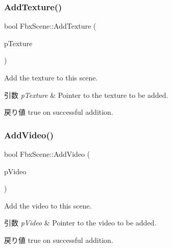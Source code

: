 \mbox{\label{class_fbx_scene_a19321c754cefd2a1576477d8e8353472}} 
\subsubsection{\texorpdfstring{Add\+Texture()}{AddTexture()}}
{\footnotesize\ttfamily bool Fbx\+Scene\+::\+Add\+Texture (\begin{DoxyParamCaption}\item[{\hyperlink{class_fbx_texture}{Fbx\+Texture} $\ast$}]{p\+Texture }\end{DoxyParamCaption})}

Add the texture to this scene. 
\begin{DoxyParams}{引数}
{\em p\+Texture} & Pointer to the texture to be added. \\
\hline
\end{DoxyParams}
\begin{DoxyReturn}{戻り値}
{\ttfamily true} on successful addition. 
\end{DoxyReturn}
\mbox{\label{class_fbx_scene_ae71fcbb60eadb1ba418e210d8104cc54}} 
\subsubsection{\texorpdfstring{Add\+Video()}{AddVideo()}}
{\footnotesize\ttfamily bool Fbx\+Scene\+::\+Add\+Video (\begin{DoxyParamCaption}\item[{\hyperlink{class_fbx_video}{Fbx\+Video} $\ast$}]{p\+Video }\end{DoxyParamCaption})}

Add the video to this scene. 
\begin{DoxyParams}{引数}
{\em p\+Video} & Pointer to the video to be added. \\
\hline
\end{DoxyParams}
\begin{DoxyReturn}{戻り値}
true on successful addition. 
\end{DoxyReturn}
\mbox{\label{class_fbx_scene_af0294acb0289fddc113209d70aca2721}} 
